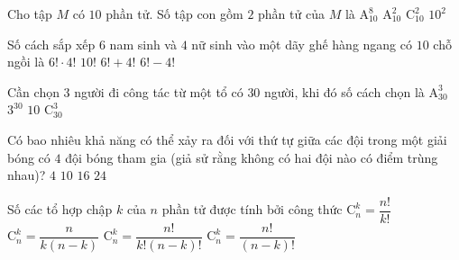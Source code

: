 

\begin{ex}%
	Cho tập $M$ có $10$ phần tử. Số tập con gồm $2$ phần tử  của $M$ là
	 \choice
		 {$\mathrm{A}_{10}^8$}
		{$\mathrm{A}_{10}^2$} 
		{\True $\mathrm{C}_{10}^2$} 
		{$10^2$} 
\end{ex}

\begin{ex}%
	Số cách sắp xếp $6$ nam sinh và $4$ nữ sinh vào một dãy ghế hàng ngang có  $10$ chỗ ngồi là
	\choice 
		{$6!\cdot 4!$} 
		 {\True $10!$}
		{$6!+4!$} 
		 {$6!-4!$}
\end{ex}

\begin{ex}%
	Cần chọn $3$ người đi công tác từ một tổ  có $30$ người, khi đó số cách chọn là
	 \choice
		{$\mathrm{A}_{30}^3$} 
		{$3^{30}$} 
		 {$10$}
		{\True $\mathrm{C}_{30}^3$} 
\end{ex}

\begin{ex}%
	Có bao nhiêu khả năng có thể xảy ra đối với thứ tự giữa các đội trong một giải bóng có $4$ đội bóng tham gia (giả sử rằng không có hai  đội nào có điểm trùng nhau)?
	 \choice
		 {$4$}
		 {$10$}
		 {$16$}
		{\True $24$} 
\end{ex}

\begin{ex}%
	Số các tổ hợp chập $k$ của $n$ phần  tử được tính bởi công thức
	\choice 
		{$\mathrm{C}_{n}^{k} =  \dfrac{n!}{k!}$}
		{$\mathrm{C}_{n}^{k} = \dfrac{n}{k(n-k)}$} 
		{\True $\mathrm{C}_{n}^{k}  = \dfrac{n!}{k!(n-k)!}$}
		{$\mathrm{C}_{n}^{k}  = \dfrac{n!}{(n-k)!}$}
\end{ex}


